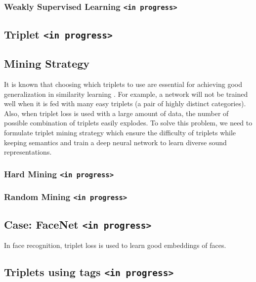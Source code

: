 \subsubsection*{Weakly Supervised Learning \texttt{<in progress>}}
\subsection{Triplet \texttt{<in progress>}}
\subsection{Mining Strategy}
 It is known that choosing which triplets to use are essential for achieving good generalization in similarity learning \cite{FaceNet}. For example, a network will not be trained well when it is fed with many easy triplets (a pair of highly distinct categories). Also, when triplet loss is used with a large amount of data, the number of possible combination of triplets easily explodes. To solve this problem, we need to formulate triplet mining strategy which ensure the difficulty of triplets  while keeping semantics and train a deep neural network to learn diverse sound representations. 


\subsubsection*{Hard Mining \texttt{<in progress>}}

\subsubsection*{Random Mining \texttt{<in progress>}}

\subsection{Case: FaceNet \texttt{<in progress>}}
In face recognition, triplet loss is used to learn good embeddings of faces.

\subsection{Triplets using tags \texttt{<in progress>}}

